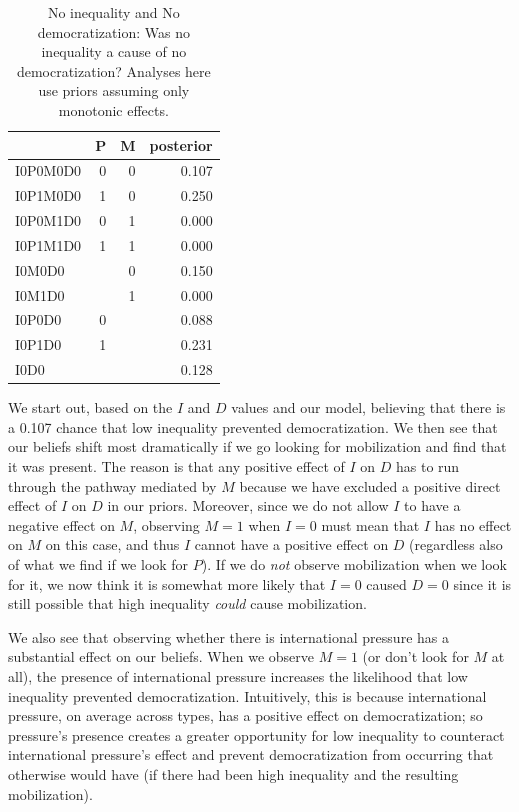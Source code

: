 \documentclass[
  12pt,
]{book}
\begin{document}
\begin{table}

\caption{\label{tab:Tapp1}No inequality and No democratization: Was no inequality a cause of no democratization? Analyses here use priors assuming only monotonic effects.}
\centering
\begin{tabular}[t]{l|r|r|r}
\hline
  & P & M & posterior\\
\hline
I0P0M0D0 & 0 & 0 & 0.107\\
\hline
I0P1M0D0 & 1 & 0 & 0.250\\
\hline
I0P0M1D0 & 0 & 1 & 0.000\\
\hline
I0P1M1D0 & 1 & 1 & 0.000\\
\hline
I0M0D0 &  & 0 & 0.150\\
\hline
I0M1D0 &  & 1 & 0.000\\
\hline
I0P0D0 & 0 &  & 0.088\\
\hline
I0P1D0 & 1 &  & 0.231\\
\hline
I0D0 &  &  & 0.128\\
\hline
\end{tabular}
\end{table}

We start out, based on the \(I\) and \(D\) values and our model, believing that there is a 0.107 chance that low inequality prevented democratization. We then see that our beliefs shift most dramatically if we go looking for mobilization and find that it was present. The reason is that any positive effect of \(I\) on \(D\) has to run through the pathway mediated by \(M\) because we have excluded a positive direct effect of \(I\) on \(D\) in our priors. Moreover, since we do not allow \(I\) to have a negative effect on \(M\), observing \(M=1\) when \(I=0\) must mean that \(I\) has no effect on \(M\) on this case, and thus \(I\) cannot have a positive effect on \(D\) (regardless also of what we find if we look for \(P\)). If we do \emph{not} observe mobilization when we look for it, we now think it is somewhat more likely that \(I=0\) caused \(D=0\) since it is still possible that high inequality \emph{could} cause mobilization.

We also see that observing whether there is international pressure has a substantial effect on our beliefs. When we observe \(M=1\) (or don't look for \(M\) at all), the presence of international pressure increases the likelihood that low inequality prevented democratization. Intuitively, this is because international pressure, on average across types, has a positive effect on democratization; so pressure's presence creates a greater opportunity for low inequality to counteract international pressure's effect and prevent democratization from occurring that otherwise would have (if there had been high inequality and the resulting mobilization).
\end{document}
